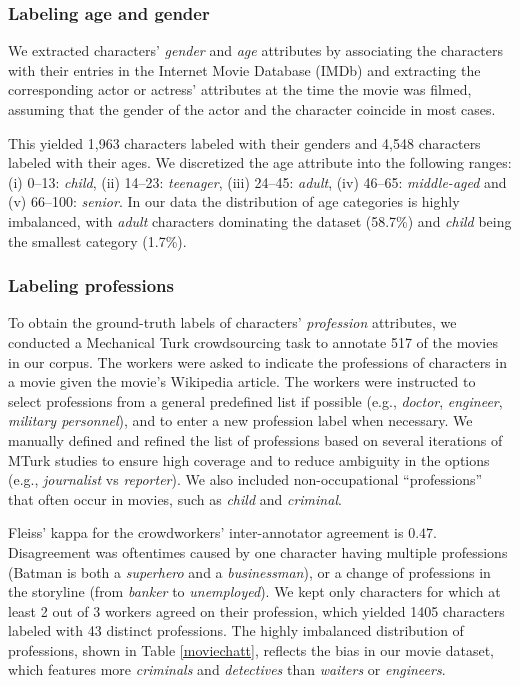 \subsubsection{Labeling age and gender} 

We extracted characters' \textit{gender} and \textit{age} attributes by associating the characters with their entries in the Internet Movie Database (\gls{IMDb}) and extracting the corresponding actor or actress' attributes at the time the movie was filmed, assuming that the gender of the actor and the character coincide in most cases.

This yielded 1,963 characters labeled with their genders and 4,548 characters labeled with their ages.
We discretized the age attribute into the following ranges:
(i) 0--13: \textit{child}, (ii) 14--23: \textit{teenager}, (iii) 24--45: \textit{adult}, (iv) 46--65: \textit{middle-aged} and (v) 66--100: \textit{senior}.
In our data the distribution of age categories is highly imbalanced, with \textit{adult} characters dominating the dataset (58.7\%) and \textit{child} being the smallest category (1.7\%).

\subsubsection{Labeling professions} 
\label{kappa1}

To obtain the ground-truth labels of characters' \textit{profession} attributes, we conducted a Mechanical Turk crowdsourcing task to annotate 517 of the movies in our corpus.
The workers were asked to indicate the professions of characters in a movie given
the movie's Wikipedia article.
The workers were instructed to select professions from a general predefined list if possible (e.g., \textit{doctor}, \textit{engineer}, \textit{military personnel}), and to enter a new profession label when necessary.
We manually defined and refined the list of professions based on several iterations of MTurk studies to ensure 
high coverage
and to reduce ambiguity in the options (e.g., \textit{journalist} vs \textit{reporter}).
We also included non-occupational ``professions'' that often occur in movies,
such as \textit{child} and \textit{criminal}.

Fleiss' kappa for the crowdworkers' inter-annotator agreement is $0.47$.
Disagreement was oftentimes caused by one character having multiple professions (Batman is both a \textit{superhero} and a \textit{businessman}), or a change of professions in the storyline (from \textit{banker} to \textit{unemployed}).
We kept only characters for which at least 2 out of 3 workers agreed on their profession,
which yielded 1405 characters labeled with 43 distinct professions.
The highly imbalanced distribution of professions, shown in Table \ref{moviechatt}, reflects the bias in our movie dataset, which features more \textit{criminals} and \textit{detectives} than \textit{waiters} or \textit{engineers}.

